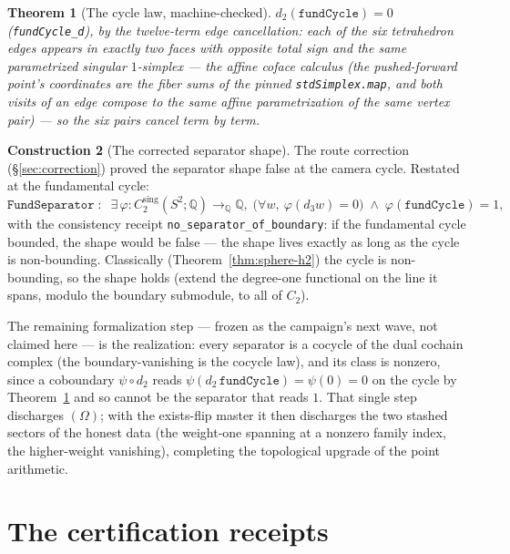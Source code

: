 \documentclass[11pt,a4paper]{article}
\theoremstyle{plain}
\newtheorem{theorem}{Theorem}[section]
\theoremstyle{definition}
\newtheorem{construction}[theorem]{Construction}
\newcommand{\Q}{\mathbb{Q}}
\begin{document}
\begin{theorem}[The cycle law, machine-checked]
\label{thm:fund-cycle-d}
$d_2(\texttt{fundCycle}) = 0$ (\texttt{fundCycle\_d}), by the
twelve-term edge cancellation: each of the six tetrahedron edges
appears in exactly two faces with opposite total sign and the
\emph{same} parametrized singular $1$-simplex --- the affine coface
calculus (the pushed-forward point's coordinates are the fiber sums
of the pinned \texttt{stdSimplex.map}, and both visits of an edge
compose to the same affine parametrization of the same vertex pair)
--- so the six pairs cancel term by term.
\end{theorem}

\begin{construction}[The corrected separator shape]
\label{con:fund-separator}
The route correction (\S\ref{sec:correction}) proved the separator
shape false at the camera cycle.  Restated at the fundamental cycle:
\[
\texttt{FundSeparator} \;:\;\;
  \exists\, \varphi : C_2^{\mathrm{sing}}(S^2;\Q) \to_\Q \Q,\;
  \bigl(\forall w,\ \varphi(d_3 w) = 0\bigr) \;\wedge\;
  \varphi(\texttt{fundCycle}) = 1 ,
\]
with the consistency receipt \texttt{no\_separator\_of\_boundary}: if
the fundamental cycle bounded, the shape would be false --- the shape
lives exactly as long as the cycle is non-bounding.  Classically
(Theorem~\ref{thm:sphere-h2}) the cycle is non-bounding, so the shape
holds (extend the degree-one functional on the line it spans, modulo
the boundary submodule, to all of $C_2$).
\end{construction}

The remaining formalization step --- frozen as the campaign's next
wave, not claimed here --- is the realization: every separator is a
cocycle of the dual cochain complex (the boundary-vanishing is the
cocycle law), and its class is nonzero, since a coboundary $\psi
\circ d_2$ reads $\psi(d_2\,\texttt{fundCycle}) = \psi(0) = 0$ on the
cycle by Theorem~\ref{thm:fund-cycle-d} and so cannot be the
separator that reads $1$.  That single step discharges $(\Omega)$;
with the exists-flip master it then discharges the two stashed
sectors of the honest data (the weight-one spanning at a nonzero
family index, the higher-weight vanishing), completing the
topological upgrade of the point arithmetic.

\section{The certification receipts}\label{sec:certification}
\end{document}
